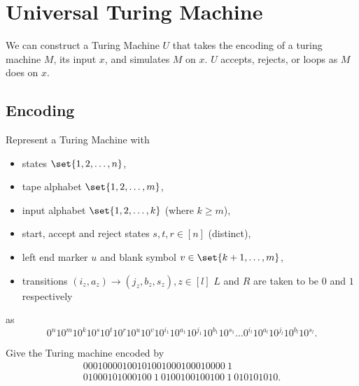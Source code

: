 \section{Universal Turing Machine} \label{sec:utm}
We can construct a Turing Machine $U$ that takes the encoding of a turing
machine $M$, its input $x$, and simulates $M$ on $x$.
$U$ accepts, rejects, or loops as $M$ does on $x$.

\subsection{Encoding} \label{sec:tm:encoding}
Represent a Turing Machine with
\begin{itemize}
    \item states $\set{1, 2, \dots, n}$,
    \item tape alphabet $\set{1, 2, \dots, m}$,
    \item input alphabet $\set{1, 2, \dots, k}$ (where $k \geq m$),
    \item start, accept and reject states $s, t, r \in [n]$ (distinct),
    \item left end marker $u$ and blank symbol $v \in \set{k + 1, \dots, m}$,
    \item transitions $(i_z, a_z) \to (j_z, b_z, s_z), z \in [l]$
    $L$ and $R$ are taken to be $0$ and $1$ respectively
\end{itemize} as \[
0^n 1 0^m 1 0^k 1 0^s 1 0^t 1 0^r 1 0^u 1 0^v 1 0^{i_1} 1 0^{a_1} 1 0^{j_1} 1 0^{b_1} 1 0^{s_1} \dots 0^{i_l} 1 0^{a_l} 1 0^{j_l} 1 0^{b_l} 1 0^{s_l}.
\]
\begin{exercise}
    Give the Turing machine encoded by \begin{multline*}
        00010000100101001000100010000\ 1\\
        01000101000100\ 1\ 0100100100100\ 1\ 010101010.
    \end{multline*}
\end{exercise}
\begin{solution} \leavevmode
    \begin{center}
    \end{center}
    \vspace{-2em}
\end{solution}

